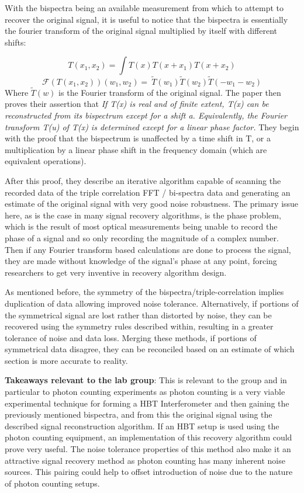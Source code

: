\documentclass[a4paper]{article}
\begin{document}
With the bispectra being an available measurement from which to attempt to recover the original signal,  it is useful to notice that the bispectra is essentially the fourier transform of the original signal multiplied by itself with different shifts:

\[T\left(x_1,x_2\right)=  \int T\left(x\right)T\left(x+x_1\right)T(x+x_2)\]
\[\mathcal{F}\left(T\left(x_1,x_2\right)\right)\left(w_1,w_2\right)=\ \widetilde{T}(w_1)\widetilde{T}(w_2)\widetilde{T}(-w_1-w_2)\]
Where $\widetilde{T}(w)$ is the Fourier transform of the original signal. The paper then proves their assertion that \textit{If T(x) is real and of finite extent, T(x) can be reconstructed from its bispectrum except for a shift a. Equivalently, the Fourier transform T(u) of T(x) is determined except for a linear phase factor.}
They begin with the proof that the bispectrum is unaffected by a time shift in T, or a multiplication by a linear phase shift in the frequency domain (which are equivalent operations).

After this proof, they describe an iterative algorithm capable of scanning the recorded data of the triple correlation FFT / bi-spectra data and generating an estimate of the original signal with very good noise robustness. The primary issue here, as is the case in many signal recovery algorithms, is the phase problem, which is the result of most optical measurements being unable to record the phase of a signal and so only recording the magnitude of a complex number. Then if any Fourier transform based calculations are done to process the signal, they are made without knowledge of the signal's phase at any point, forcing researchers to get very inventive in recovery algorithm design.

As mentioned before, the symmetry of the bispectra/triple-correlation implies duplication of data allowing improved noise tolerance. Alternatively, if portions of the symmetrical signal are lost rather than distorted by noise, they can be recovered using the symmetry rules described within, resulting in a greater tolerance of noise and data loss. Merging these methods, if portions of symmetrical data disagree, they can be reconciled based on an estimate of which section is more accurate to reality. 

\textbf{Takeaways relevant to the lab group}: This is relevant to the group and in particular to photon counting experiments as photon counting is a very viable experimental technique for forming a HBT Interferometer and then gaining the previously mentioned bispectra, and from this the original signal using the described signal reconstruction algorithm. If an HBT setup is used using the photon counting equipment, an implementation of this recovery algorithm could prove very useful. The noise tolerance properties of this method also make it an attractive signal recovery method as photon counting has many inherent noise sources. This pairing could help to offset introduction of noise due to the nature of photon counting setups.
\end{document}
